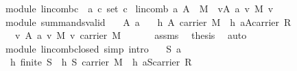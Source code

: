 \begin{isabellebody}
\isamarkuptrue%
\isamarkupfalse%
\ {\isacharparenleft}\ module{\isacharparenright}\ lincomb{\isacharcolon}{\isacharcolon}{\isachardoublequoteopen}{\isacharbrackleft}{\isacharprime}c\ {\isasymRightarrow}\ {\isacharprime}a{\isacharcomma}\ {\isacharprime}c\ set{\isacharbrackright}{\isasymRightarrow}\ {\isacharprime}c{\isachardoublequoteclose}\isanewline
{}\ {\isachardoublequoteopen}lincomb\ a\ A\ {\isacharequal}\ {\isacharparenleft}{\isasymOplus}\isactrlbsub M\isactrlesub \ \ v{\isasymin}A{\isachardot}\ {\isacharparenleft}a\ v\ {\isasymodot}\isactrlbsub M\isactrlesub \ v{\isacharparenright}{\isacharparenright}{\isachardoublequoteclose}\isanewline
\isanewline
{}\isamarkupfalse%
\ {\isacharparenleft}\ module{\isacharparenright}\ summands{\isacharunderscore}valid{\isacharcolon}\isanewline
\ \ \ A\ a\isanewline
\ \ \ h{}{\isacharcolon}\ {\isachardoublequoteopen}A{\isasymsubseteq}\ carrier\ M{\isachardoublequoteclose}\ \ h{}{\isacharcolon}\ {\isachardoublequoteopen}a{\isasymin}{\isacharparenleft}A{\isasymrightarrow}carrier\ R{\isacharparenright}{\isachardoublequoteclose}\isanewline
\ \ \ {\isachardoublequoteopen}{\isasymforall}\ v{\isasymin}\ A{\isachardot}\ {\isacharparenleft}{\isacharparenleft}{\isacharparenleft}a\ v{\isacharparenright}\ {\isasymodot}\isactrlbsub M\isactrlesub \ v{\isacharparenright}{\isasymin}\ carrier\ M{\isacharparenright}{\isachardoublequoteclose}\isanewline
%
\isadelimproof
%
\endisadelimproof
%
\isatagproof
{}\isamarkupfalse%
\ {\isacharminus}\ \isanewline
\ \ \isamarkupfalse%
\ assms\ \isamarkupfalse%
\ {\isacharquery}thesis\ \isamarkupfalse%
\ auto\isanewline
{}\isamarkupfalse%
%
\endisatagproof
{\isafoldproof}%
%
\isadelimproof
\isanewline
%
\endisadelimproof
\isanewline
{}\isamarkupfalse%
\ {\isacharparenleft}\ module{\isacharparenright}\ lincomb{\isacharunderscore}closed\ {\isacharbrackleft}simp{\isacharcomma}\ intro{\isacharbrackright}{\isacharcolon}\isanewline
\ \ \ S\ a\isanewline
\ \ \ h{}{\isacharcolon}\ {\isachardoublequoteopen}finite\ S{\isachardoublequoteclose}\ \ h{}{\isacharcolon}\ {\isachardoublequoteopen}S{\isasymsubseteq}\ carrier\ M{\isachardoublequoteclose}\ \ h{}{\isacharcolon}\ {\isachardoublequoteopen}a{\isasymin}{\isacharparenleft}S{\isasymrightarrow}carrier\ R{\isacharparenright}{\isachardoublequoteclose}\isanewline

\end{isabellebody}
